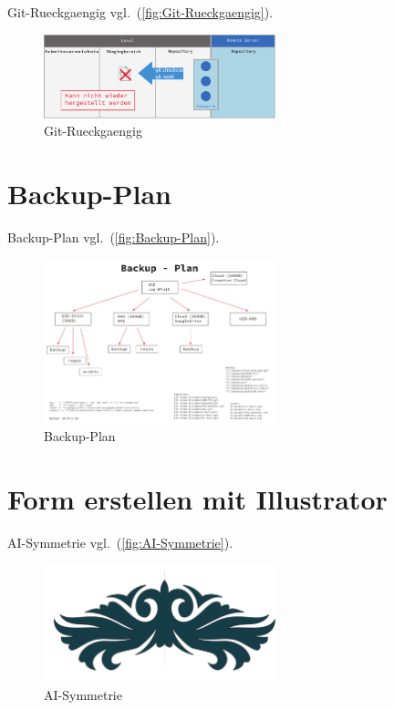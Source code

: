 Git-Rueckgaengig vgl.~(\autoref{fig:Git-Rueckgaengig}).

\begin{figure}[!hb]%
\centering
\includegraphics[width=0.6\textwidth]{Grafiken/Git-Rueckgaengig.pdf}
\caption{Git-Rueckgaengig}
\label{fig:Git-Rueckgaengig}%
\end{figure}



\section{Backup-Plan}\label{backup-plan}

Backup-Plan vgl.~(\autoref{fig:Backup-Plan}).

\begin{figure}[!hb]%
\centering
\includegraphics[width=0.6\textwidth]{Grafiken/Backup-Plan.pdf}
\caption{Backup-Plan}
\label{fig:Backup-Plan}%
\end{figure}


\section{Form erstellen mit Illustrator}\label{}

AI-Symmetrie vgl.~(\autoref{fig:AI-Symmetrie}).

\begin{figure}[!hb]%
\centering
\includegraphics[width=0.6\textwidth]{Grafiken/AI-Symmetrie.pdf}
\caption{AI-Symmetrie}
\label{fig:AI-Symmetrie}%
\end{figure}

